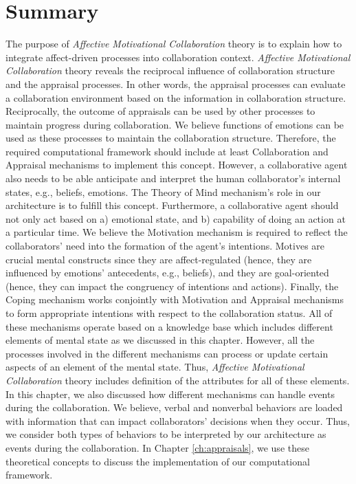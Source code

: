 \documentclass[12pt]{report}
\begin{document}
\section{Summary}
\label{sec:theory-summary}
The purpose of \textit{Affective Motivational Collaboration} theory is to
explain how to integrate affect-driven processes into collaboration context.
\textit{Affective Motivational Collaboration} theory reveals the reciprocal
influence of collaboration structure and the appraisal processes. In other
words, the appraisal processes can evaluate a collaboration environment based on
the information in collaboration structure. Reciprocally, the outcome of
appraisals can be used by other processes to maintain progress during
collaboration. We believe functions of emotions can be used as these processes
to maintain the collaboration structure. Therefore, the required computational
framework should include at least Collaboration and Appraisal mechanisms to
implement this concept. However, a collaborative agent also needs to be able
anticipate and interpret the human collaborator's internal states, e.g.,
beliefs, emotions. The Theory of Mind mechanism's role in our architecture is to
fulfill this concept. Furthermore, a collaborative agent should not only act
based on a) emotional state, and b) capability of doing an action at a
particular time. We believe the Motivation mechanism is required to reflect the
collaborators' need into the formation of the agent's intentions. Motives are
crucial mental constructs since they are affect-regulated (hence, they are
influenced by emotions' antecedents, e.g., beliefs), and they are goal-oriented
(hence, they can impact the congruency of intentions and actions). Finally, the
Coping mechanism works conjointly with Motivation and Appraisal mechanisms to
form appropriate intentions with respect to the collaboration status. All of
these mechanisms operate based on a knowledge base which includes different
elements of mental state as we discussed in this chapter. However, all the
processes involved in the different mechanisms can process or update certain
aspects of an element of the mental state. Thus, \textit{Affective Motivational
Collaboration} theory includes definition of the attributes for all of these
elements. In this chapter, we also discussed how different mechanisms can handle
events during the collaboration. We believe, verbal and nonverbal behaviors are
loaded with information that can impact collaborators' decisions when they
occur. Thus, we consider both types of behaviors to be interpreted by our
architecture as events during the collaboration. In Chapter \ref{ch:appraisals},
we use these theoretical concepts to discuss the implementation of our
computational framework.
\end{document}
